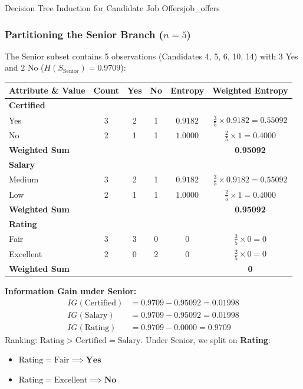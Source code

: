 \begin{example}{Decision Tree Induction for Candidate Job Offers}{job_offers}
\subsubsection{Partitioning the Senior Branch (\texorpdfstring{$n = 5$}{n = 5})}
The Senior subset contains 5 observations (Candidates 4, 5, 6, 10, 14) with $3$ Yes and $2$ No ($H(S_{\text{Senior}}) = 0.9709$):
\begin{center}\renewcommand{\arraystretch}{1.35}
\begin{tabular}{lccccc}
\toprule
\textbf{Attribute \& Value} & \textbf{Count} & \textbf{Yes} & \textbf{No} & \textbf{Entropy} & \textbf{Weighted Entropy} \\
\midrule
\textbf{Certified} & & & & & \\
Yes & 3 & 2 & 1 & $0.9182$ & $\frac{3}{5} \times 0.9182 = 0.55092$ \\
No  & 2 & 1 & 1 & $1.0000$ & $\frac{2}{5} \times 1 = 0.4000$ \\
\textbf{Weighted Sum} & & & & & \textbf{0.95092} \\
\midrule
\textbf{Salary} & & & & & \\
Medium & 3 & 2 & 1 & $0.9182$ & $\frac{3}{5} \times 0.9182 = 0.55092$ \\
Low    & 2 & 1 & 1 & $1.0000$ & $\frac{2}{5} \times 1 = 0.4000$ \\
\textbf{Weighted Sum} & & & & & \textbf{0.95092} \\
\midrule
\textbf{Rating} & & & & & \\
Fair & 3 & 3 & 0 & $0$ & $\frac{3}{5} \times 0 = 0$ \\
Excellent & 2 & 0 & 2 & $0$ & $\frac{2}{5} \times 0 = 0$ \\
\textbf{Weighted Sum} & & & & & \textbf{0} \\
\bottomrule
\end{tabular}
\end{center}

\textbf{Information Gain under Senior:}
\begin{align*}
    IG(\text{Certified}) &= 0.9709 - 0.95092 = 0.01998 \\[4pt]
    IG(\text{Salary}) &= 0.9709 - 0.95092 = 0.01998 \\[4pt]
    IG(\text{Rating}) &= 0.9709 - 0.0000 = \mathbf{0.9709}
\end{align*}
Ranking: $\text{Rating} > \text{Certified} = \text{Salary}$.
Under Senior, we split on \textbf{Rating}:
\begin{itemize}
    \item $\text{Rating} = \text{Fair} \implies \mathbf{Yes}$
    \item $\text{Rating} = \text{Excellent} \implies \mathbf{No}$
\end{itemize}


\end{example}
